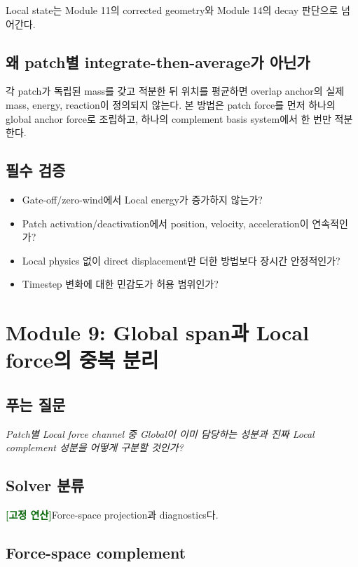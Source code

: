 \documentclass[11pt,a4paper]{article}
\newcommand{\deterministic}{\textcolor{darkgreen}{\textbf{[고정 연산]}}}
\begin{document}
Local state는 Module 11의 corrected geometry와 Module 14의 decay 판단으로 넘어간다.

\subsection*{왜 patch별 integrate-then-average가 아닌가}

각 patch가 독립된 mass를 갖고 적분한 뒤 위치를 평균하면
overlap anchor의 실제 mass, energy, reaction이 정의되지 않는다.
본 방법은 patch force를 먼저 하나의 global anchor force로 조립하고,
하나의 complement basis system에서 한 번만 적분한다.

\subsection*{필수 검증}

\begin{itemize}[leftmargin=1.5em]
  \item Gate-off/zero-wind에서 Local energy가 증가하지 않는가?
  \item Patch activation/deactivation에서 position, velocity, acceleration이 연속적인가?
  \item Local physics 없이 direct displacement만 더한 방법보다 장시간 안정적인가?
  \item Timestep 변화에 대한 민감도가 허용 범위인가?
\end{itemize}

\section{Module 9: Global span과 Local force의 중복 분리}

\subsection*{푸는 질문}

\emph{Patch별 Local force channel 중 Global이 이미 담당하는 성분과
진짜 Local complement 성분을 어떻게 구분할 것인가?}

\subsection*{Solver 분류}

\deterministic Force-space projection과 diagnostics다.

\subsection*{Force-space complement}
\end{document}
